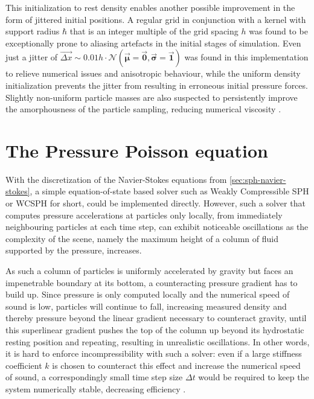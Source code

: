 \documentclass[oneside, a4paper]{book}
\newcommand\vek[1]{\vec{\bm{#1}}}
\newcommand\br[1]{\left(#1\right)}
\begin{document}
\begin{itemize}
      This initialization to rest density enables another possible improvement in the form of jittered initial positions. A regular grid in conjunction with a kernel with support radius $\hbar$ that is an integer multiple of the grid spacing $h$ was found to be exceptionally prone to aliasing artefacts in the initial stages of simulation. Even just a jitter of $\overrightarrow{\Delta x} \sim 0.01h\cdot\mathcal{N}\br{\vek{\mu}=\vek{0}, \vek{\sigma}=\vek{1}}$ was found in this implementation to relieve numerical issues and anisotropic behaviour, while the uniform density initialization prevents the jitter from resulting in erroneous initial pressure forces. Slightly non-uniform particle masses are also suspected to persistently improve the amorphousness of the particle sampling, reducing numerical viscosity \autocite{labcourse}.
    \end{itemize}
   

    \section{The Pressure Poisson equation}
    With the discretization of the Navier-Stokes equations from \autoref{sec:sph-navier-stokes}, a simple equation-of-state based solver such as Weakly Compressible SPH or WCSPH for short, could be implemented directly. However, such a solver that computes pressure accelerations at particles only locally, from immediately neighbouring particles at each time step, can exhibit noticeable oscillations as the complexity of the scene, namely the maximum height of a column of fluid supported by the pressure, increases.

    As such a column of particles is uniformly accelerated by gravity but faces an impenetrable boundary at its bottom, a counteracting pressure gradient has to build up. Since pressure is only computed locally and the numerical speed of sound is low, particles will continue to fall, increasing measured density and thereby pressure beyond the linear gradient necessary to counteract gravity, until this superlinear gradient pushes the top of the column up beyond its hydrostatic resting position and repeating, resulting in unrealistic oscillations. In other words, it is hard to enforce incompressibility with such a solver: even if a large stiffness coefficient $k$ is chosen to counteract this effect and increase the numerical speed of sound, a correspondingly small time step size $\Delta t$ would be required to keep the system numerically stable, decreasing efficiency \autocite{iisph}. 
    
\end{document}
